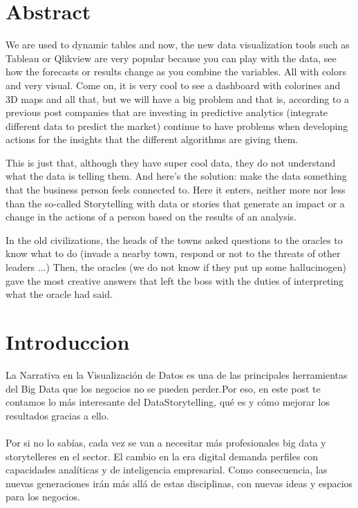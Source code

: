 {\section{Abstract}
\item{We are used to dynamic tables and now, the new data visualization tools such as Tableau or Qlikview are very popular because you can play with the data, see how the forecasts or results change as you combine the variables. All with colors and very visual. Come on, it is very cool to see a dashboard with colorines and 3D maps and all that, but we will have a big problem and that is, according to a previous post companies that are investing in predictive analytics (integrate different data to predict the market) continue to have problems when developing actions for the insights that the different algorithms are giving them.

This is just that, although they have super cool data, they do not understand what the data is telling them. And here's the solution: make the data something that the business person feels connected to. Here it enters, neither more nor less than the so-called Storytelling with data or stories that generate an impact or a change in the actions of a person based on the results of an analysis.

In the old civilizations, the heads of the towns asked questions to the oracles to know what to do (invade a nearby town, respond or not to the threats of other leaders ...) Then, the oracles (we do not know if they put up some hallucinogen) gave the most creative answers that left the boss with the duties of interpreting what the oracle had said.
\newpage

\section{Introduccion}
\item{La Narrativa en la Visualización de Datos es una de las principales herramientas del Big Data que los negocios no se pueden perder.Por eso, en este post te contamos lo más interesante del DataStorytelling, qué es y cómo mejorar los resultados gracias a ello.\\\\
Por si no lo sabías, cada vez se van a necesitar más profesionales big data y  storytelleres en el sector. El cambio en la era digital demanda perfiles con capacidades analíticas y de inteligencia empresarial. Como consecuencia, las nuevas generaciones irán más allá de estas disciplinas, con nuevas ideas y espacios para los negocios.}

}}
